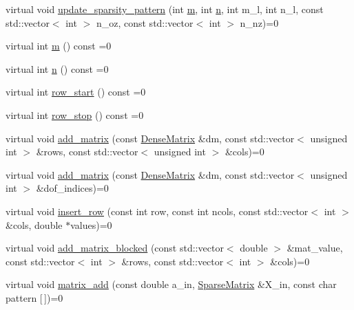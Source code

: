 \begin{DoxyCompactItemize}
virtual void \mbox{\hyperlink{classfemus_1_1_sparse_matrix_ab879def1d15c0a8d14d47db027a6ebcd}{update\+\_\+sparsity\+\_\+pattern}} (int \mbox{\hyperlink{classfemus_1_1_sparse_matrix_a5f38aba83ed856290810a321a28480a7}{m}}, int \mbox{\hyperlink{classfemus_1_1_sparse_matrix_aac007c0926a2f3ffe6f01ba97608ea15}{n}}, int m\+\_\+l, int n\+\_\+l, const std\+::vector$<$ int $>$ n\+\_\+oz, const std\+::vector$<$ int $>$ n\+\_\+nz)=0
\item 
virtual int \mbox{\hyperlink{classfemus_1_1_sparse_matrix_a5f38aba83ed856290810a321a28480a7}{m}} () const =0
\item 
virtual int \mbox{\hyperlink{classfemus_1_1_sparse_matrix_aac007c0926a2f3ffe6f01ba97608ea15}{n}} () const =0
\item 
virtual int \mbox{\hyperlink{classfemus_1_1_sparse_matrix_a2a5351deb9332ad119f4bcf9f376eed3}{row\+\_\+start}} () const =0
\item 
virtual int \mbox{\hyperlink{classfemus_1_1_sparse_matrix_a178d3324c3cedd0b39a6d5931bfd6da1}{row\+\_\+stop}} () const =0
\item 
virtual void \mbox{\hyperlink{classfemus_1_1_sparse_matrix_a3a8dcbf32d59973ebd7fc6280f9ec10c}{add\+\_\+matrix}} (const \mbox{\hyperlink{classfemus_1_1_dense_matrix}{Dense\+Matrix}} \&dm, const std\+::vector$<$ unsigned int $>$ \&rows, const std\+::vector$<$ unsigned int $>$ \&cols)=0
\item 
virtual void \mbox{\hyperlink{classfemus_1_1_sparse_matrix_a7c54ac89800473bd8d85632228a0876e}{add\+\_\+matrix}} (const \mbox{\hyperlink{classfemus_1_1_dense_matrix}{Dense\+Matrix}} \&dm, const std\+::vector$<$ unsigned int $>$ \&dof\+\_\+indices)=0
\item 
virtual void \mbox{\hyperlink{classfemus_1_1_sparse_matrix_a01ae77d1793c3b5ed5bed72b0659e1c2}{insert\+\_\+row}} (const int row, const int ncols, const std\+::vector$<$ int $>$ \&cols, double $\ast$values)=0
\item 
virtual void \mbox{\hyperlink{classfemus_1_1_sparse_matrix_aac0370cebbcc2d7111660dcf7115ebbf}{add\+\_\+matrix\+\_\+blocked}} (const std\+::vector$<$ double $>$ \&mat\+\_\+value, const std\+::vector$<$ int $>$ \&rows, const std\+::vector$<$ int $>$ \&cols)=0
\item 
virtual void \mbox{\hyperlink{classfemus_1_1_sparse_matrix_a0079f46bb37ec387ebb432ee7128aed5}{matrix\+\_\+add}} (const double a\+\_\+in, \mbox{\hyperlink{classfemus_1_1_sparse_matrix}{Sparse\+Matrix}} \&X\+\_\+in, const char pattern \mbox{[}$\,$\mbox{]})=0
\item 

\end{DoxyCompactItemize}
